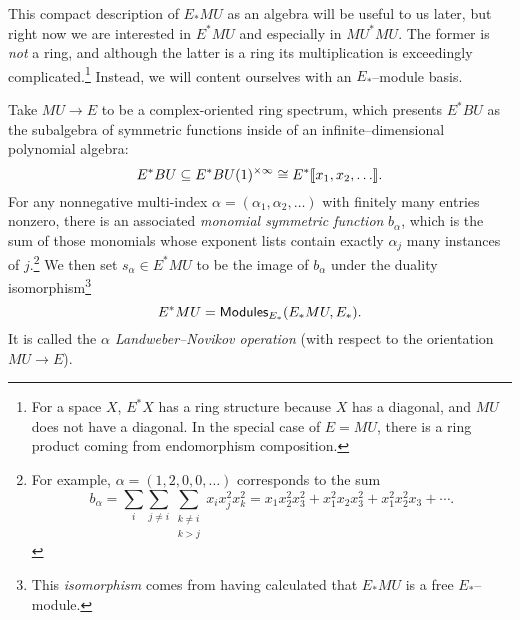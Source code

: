 
This compact description of $E_* MU$ as an algebra will be useful to us later, but right now we are interested in $E^* MU$ and especially in $MU^* MU$.  The former is \emph{not} a ring, and although the latter is a ring its multiplication is exceedingly complicated.\footnote{For a space $X$, $E^* X$ has a ring structure because $X$ has a diagonal, and $MU$ does not have a diagonal.  In the special case of $E = MU$, there is a ring product coming from endomorphism composition.}  Instead, we will content ourselves with an $E_*$--module basis.
\begin{definition}
Take $MU \to E$ to be a complex-oriented ring spectrum, which presents $E^* BU$ as the subalgebra of symmetric functions inside of an infinite--dimensional polynomial algebra: \[E^* BU \subseteq E^* BU(1)^{\times \infty} \cong E^*\llbracket{x_1, x_2, \ldots}\rrbracket.\]  For any nonnegative multi-index $\alpha = (\alpha_1, \alpha_2, \ldots)$ with finitely many entries nonzero, there is an associated \textit{monomial symmetric function} $b_\alpha$, which is the sum of those monomials whose exponent lists contain exactly $\alpha_j$ many instances of $j$.\footnote{For example, $\alpha = (1, 2, 0, 0, \ldots)$ corresponds to the sum \[b_\alpha = \sum_i \sum_{j \ne i} \sum_{\substack{k \ne i \\ k > j}} x_i x_j^2 x_k^2 = x_1 x_2^2 x_3^2 + x_1^2 x_2 x_3^2 + x_1^2 x_2^2 x_3 + \cdots.\]}  We then set $s_\alpha \in E^* MU$ to be the image of $b_\alpha$ under the duality isomorphism\footnote{This \emph{isomorphism} comes from having calculated that $E_* MU$ is a free $E_*$--module.} \[E^* MU = \mathsf{Modules}_{E_*}(E_* MU, E_*).\]  It is called the \textit{$\alpha${\th} Landweber--Novikov operation} (with respect to the orientation $MU \to E$).
\end{definition}

